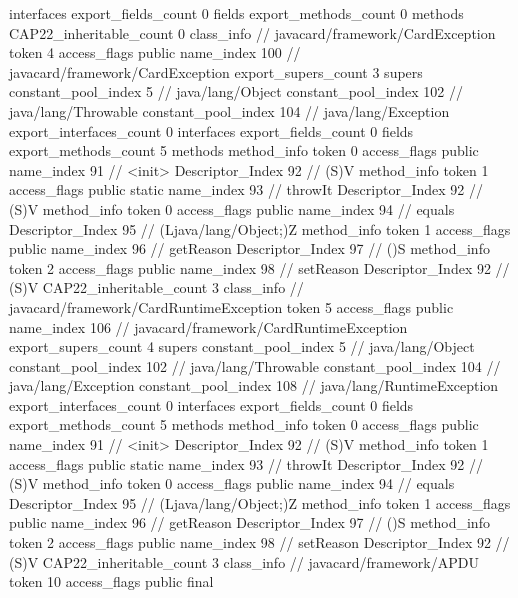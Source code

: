 {{{			interfaces {
			}
			export_fields_count	0
			fields {
			}
			export_methods_count	0
			methods {
			}
			CAP22_inheritable_count	0
		}
		class_info {		// javacard/framework/CardException
			token	4
			access_flags	public
			name_index	100		// javacard/framework/CardException
			export_supers_count	3
			supers {
				constant_pool_index	5		// java/lang/Object
				constant_pool_index	102		// java/lang/Throwable
				constant_pool_index	104		// java/lang/Exception
			}
			export_interfaces_count	0
			interfaces {
			}
			export_fields_count	0
			fields {
			}
			export_methods_count	5
			methods {
				method_info {
					token	0
					access_flags	public
					name_index	91		// <init>
					Descriptor_Index	92		// (S)V
				}
				method_info {
					token	1
					access_flags	public static
					name_index	93		// throwIt
					Descriptor_Index	92		// (S)V
				}
				method_info {
					token	0
					access_flags	public
					name_index	94		// equals
					Descriptor_Index	95		// (Ljava/lang/Object;)Z
				}
				method_info {
					token	1
					access_flags	public
					name_index	96		// getReason
					Descriptor_Index	97		// ()S
				}
				method_info {
					token	2
					access_flags	public
					name_index	98		// setReason
					Descriptor_Index	92		// (S)V
				}
			}
			CAP22_inheritable_count	3
		}
		class_info {		// javacard/framework/CardRuntimeException
			token	5
			access_flags	public
			name_index	106		// javacard/framework/CardRuntimeException
			export_supers_count	4
			supers {
				constant_pool_index	5		// java/lang/Object
				constant_pool_index	102		// java/lang/Throwable
				constant_pool_index	104		// java/lang/Exception
				constant_pool_index	108		// java/lang/RuntimeException
			}
			export_interfaces_count	0
			interfaces {
			}
			export_fields_count	0
			fields {
			}
			export_methods_count	5
			methods {
				method_info {
					token	0
					access_flags	public
					name_index	91		// <init>
					Descriptor_Index	92		// (S)V
				}
				method_info {
					token	1
					access_flags	public static
					name_index	93		// throwIt
					Descriptor_Index	92		// (S)V
				}
				method_info {
					token	0
					access_flags	public
					name_index	94		// equals
					Descriptor_Index	95		// (Ljava/lang/Object;)Z
				}
				method_info {
					token	1
					access_flags	public
					name_index	96		// getReason
					Descriptor_Index	97		// ()S
				}
				method_info {
					token	2
					access_flags	public
					name_index	98		// setReason
					Descriptor_Index	92		// (S)V
				}
			}
			CAP22_inheritable_count	3
		}
		class_info {		// javacard/framework/APDU
			token	10
			access_flags	public final
}}}
